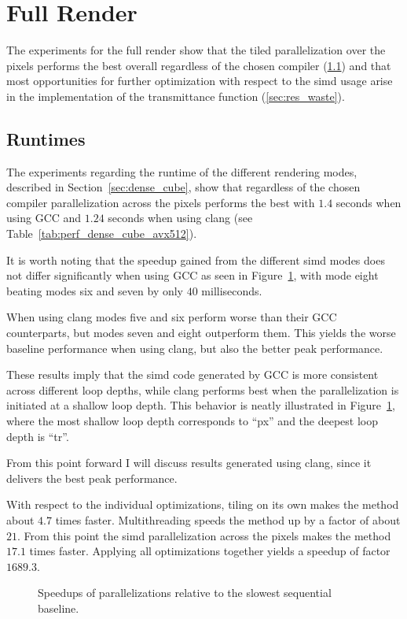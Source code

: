 \documentclass[a4paper, 11pt]{memoir}
\begin{document}
    \section{Full Render}
    \label{sec:res_full_render}
    The experiments for the full render show that the tiled parallelization over the pixels performs the best overall
    regardless of the chosen compiler (\ref{sec:res_runtimes}) and that most opportunities for further optimization
    with respect to the \gls{simd} usage arise in the implementation of the transmittance function (\ref{sec:res_waste}).

    \subsection{Runtimes}
    \label{sec:res_runtimes}
    The experiments regarding the runtime of the different rendering modes, described in Section~\ref{sec:dense_cube},
    show that regardless of the chosen compiler parallelization across the pixels performs the best with $1.4$ seconds
    when using GCC and $1.24$ seconds when using clang (see Table~\ref{tab:perf_dense_cube_avx512}).

    It is worth noting that the speedup gained from the different \gls{simd} modes does not differ significantly when using
    GCC as seen in Figure~\ref{fig:speedups}, with mode eight beating modes six and seven by only $40$ milliseconds.

    When using clang modes five and six perform worse than their GCC counterparts, but modes seven and eight outperform
    them. This yields the worse baseline performance when using clang, but also the better peak performance.

    These results imply that the \gls{simd} code generated by GCC is more consistent across different loop depths, while
    clang performs best when the parallelization is initiated at a shallow loop depth. This behavior is neatly illustrated
    in Figure~\ref{fig:speedups}, where the most shallow loop depth corresponds to \enquote{px} and the deepest loop depth
    is \enquote{tr}.

    From this point forward I will discuss results generated using clang, since it delivers the best peak performance.
    
    With respect to the individual optimizations, tiling on its own makes the method about $4.7$ times faster. Multithreading
    speeds the method up by a factor of about $21$. From this point the \gls{simd} parallelization across the pixels makes
    the method $17.1$ times faster. Applying all optimizations together yields a speedup of factor $1689.3$.
    \begin{figure}[t]
        \centering
        
        \caption{Speedups of parallelizations relative to the slowest sequential baseline.}
        \label{fig:speedups}
    \end{figure}
\end{document}
